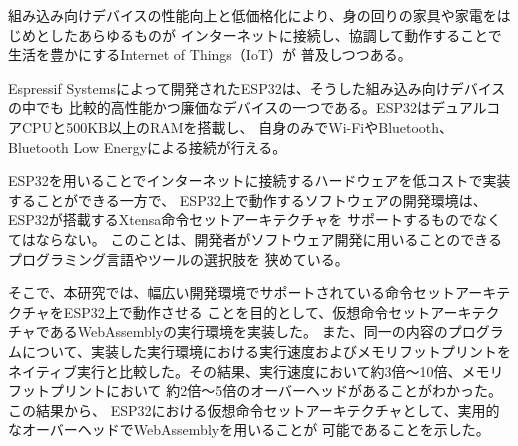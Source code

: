 \begin{jabstract}

組み込み向けデバイスの性能向上と低価格化により、身の回りの家具や家電をはじめとしたあらゆるものが
インターネットに接続し、協調して動作することで生活を豊かにするInternet of Things（IoT）が
普及しつつある。

Espressif Systemsによって開発されたESP32\cite{esp32}は、そうした組み込み向けデバイスの中でも
比較的高性能かつ廉価なデバイスの一つである。ESP32はデュアルコアCPUと500KB以上のRAMを搭載し、
自身のみでWi-FiやBluetooth、Bluetooth Low Energyによる接続が行える。

ESP32を用いることでインターネットに接続するハードウェアを低コストで実装することができる一方で、
ESP32上で動作するソフトウェアの開発環境は、ESP32が搭載するXtensa命令セットアーキテクチャを
サポートするものでなくてはならない。
このことは、開発者がソフトウェア開発に用いることのできるプログラミング言語やツールの選択肢を
狭めている。

そこで、本研究では、幅広い開発環境でサポートされている命令セットアーキテクチャをESP32上で動作させる
ことを目的として、仮想命令セットアーキテクチャであるWebAssemblyの実行環境を実装した。
また、同一の内容のプログラムについて、実装した実行環境における実行速度およびメモリフットプリントを
ネイティブ実行と比較した。その結果、実行速度において約3倍〜10倍、メモリフットプリントにおいて
約2倍〜5倍のオーバーヘッドがあることがわかった。この結果から、
ESP32における仮想命令セットアーキテクチャとして、実用的なオーバーヘッドでWebAssemblyを用いることが
可能であることを示した。

\end{jabstract}
